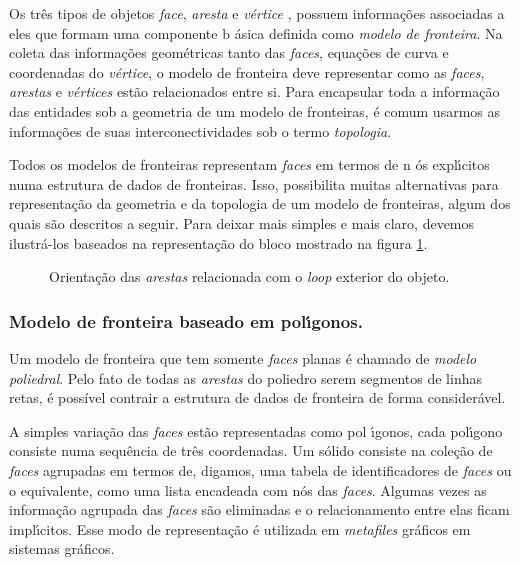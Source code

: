 \documentclass[12pt,a4paper]{book}
\begin{document}
Os tr\^{e}s tipos de objetos \textit{face}, \textit{aresta} e \textit{v\'{e}rtice}%
, possuem informa\c{c}\~{o}es associadas a eles que formam uma componente b%
\'{a}sica definida como \textit{modelo de fronteira}. Na coleta das informa\c{c}\~{o}es
geom\'{e}tricas tanto das \textit{faces}, equa\c{c}\~{o}es de curva e
coordenadas do \textit{v\'{e}rtice}, o modelo de fronteira deve representar
como as \textit{faces}, \textit{arestas} e \textit{v\'{e}rtices} est\~{a}o
relacionados entre si. Para encapsular toda a informa\c{c}\~{a}o das
entidades sob a geometria de um modelo de fronteiras, \'{e} comum usarmos as
informa\c{c}\~{o}es de suas interconectividades sob o termo \textit{topologia}.

Todos os modelos de fronteiras representam \textit{faces} em termos de n%
\'{o}s expl\'{\i}citos numa estrutura de dados de fronteiras. Isso,
possibilita muitas alternativas para representa\c{c}\~{a}o da geometria e da topologia 
de um modelo de fronteiras, algum dos quais s\~{a}o descritos a seguir. Para
deixar mais simples e mais claro, devemos ilustr\'{a}-los baseados na
representa\c{c}\~{a}o do bloco mostrado na
figura \ref{fig2_chapter3}.

\begin{figure}[htbp]
  \begin{center}
    \leavevmode
    
    \caption{ Orienta\c{c}\~{a}o das \textit{arestas} relacionada com o \textit{loop} exterior do objeto.}  
    \label{fig2_chapter3}
  \end{center}
\end{figure}

\subsubsection{Modelo de fronteira baseado em pol\'{\i}gonos.}

Um modelo de fronteira que tem somente \textit{faces} planas \'{e} chamado de 
\textit{modelo poliedral}. Pelo fato de todas as \textit{arestas} do poliedro 
serem segmentos de linhas retas, \'{e} poss\'{i}vel contrair a estrutura de dados
de fronteira de forma consider\'{a}vel.

A simples varia\c{c}\~{a}o das \textit{faces} est\~{a}o representadas como pol%
\'{\i}gonos, cada pol\'{\i}gono consiste numa sequ\^{e}ncia de tr\^{e}s
coordenadas. Um s\'{o}lido consiste na cole\c{c}\~{a}o de \textit{faces}
agrupadas em termos de, digamos, uma tabela de identificadores de \textit{faces%
} ou o equivalente, como uma lista encadeada com n\'{o}s das \textit{faces}. 
Algumas vezes as informa\c{c}\~{a}o agrupada das \textit{faces} s\~{a}o  eliminadas e o 
relacionamento entre elas ficam impl\'{\i}citos. Esse modo de representa\c{c}\~{a}o \'{e} 
utilizada em \textit{metafiles} gr\'{a}ficos em sistemas gr\'{a}ficos.
\end{document}
